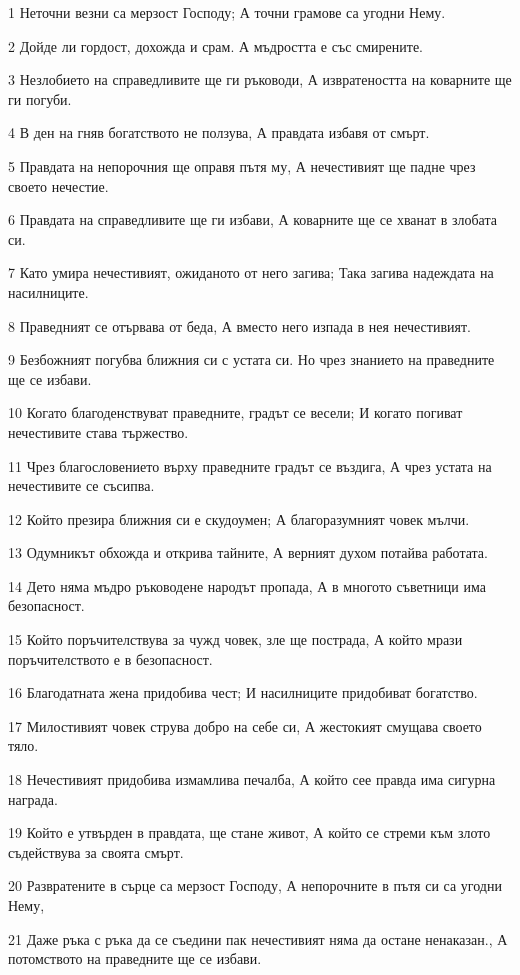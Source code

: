\par 1 Неточни везни са мерзост Господу; А точни грамове са угодни Нему.
\par 2 Дойде ли гордост, дохожда и срам. А мъдростта е със смирените.
\par 3 Незлобието на справедливите ще ги ръководи, А извратеността на коварните ще ги погуби.
\par 4 В ден на гняв богатството не ползува, А правдата избавя от смърт.
\par 5 Правдата на непорочния ще оправя пътя му, А нечестивият ще падне чрез своето нечестие.
\par 6 Правдата на справедливите ще ги избави, А коварните ще се хванат в злобата си.
\par 7 Като умира нечестивият, ожиданото от него загива; Така загива надеждата на насилниците.
\par 8 Праведният се отървава от беда, А вместо него изпада в нея нечестивият.
\par 9 Безбожният погубва ближния си с устата си. Но чрез знанието на праведните ще се избави.
\par 10 Когато благоденствуват праведните, градът се весели; И когато погиват нечестивите става тържество.
\par 11 Чрез благословението върху праведните градът се въздига, А чрез устата на нечестивите се съсипва.
\par 12 Който презира ближния си е скудоумен; А благоразумният човек мълчи.
\par 13 Одумникът обхожда и открива тайните, А верният духом потайва работата.
\par 14 Дето няма мъдро ръководене народът пропада, А в многото съветници има безопасност.
\par 15 Който поръчителствува за чужд човек, зле ще пострада, А който мрази поръчителството е в безопасност.
\par 16 Благодатната жена придобива чест; И насилниците придобиват богатство.
\par 17 Милостивият човек струва добро на себе си, А жестокият смущава своето тяло.
\par 18 Нечестивият придобива измамлива печалба, А който сее правда има сигурна награда.
\par 19 Който е утвърден в правдата, ще стане живот, А който се стреми към злото съдействува за своята смърт.
\par 20 Развратените в сърце са мерзост Господу, А непорочните в пътя си са угодни Нему,
\par 21 Даже ръка с ръка да се съедини пак  нечестивият няма да остане ненаказан., А потомството на праведните ще се избави.
